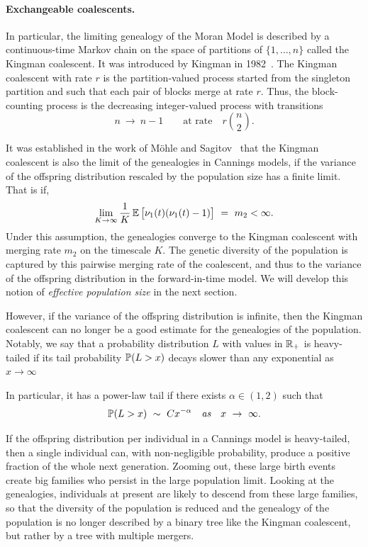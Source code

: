 \paragraph{Exchangeable coalescents.}
In particular, the limiting genealogy of the Moran Model is described by a continuous-time Markov chain on the space of partitions of $\{1,\ldots,n\}$ called the Kingman coalescent. It was introduced by Kingman in 1982~\cite{Kingman:1982aa}.
The Kingman coalescent with rate $r$ is the partition-valued process started from the singleton partition and such that each pair of blocks merge at rate $r$. 
Thus, the block-counting process is the decreasing integer-valued process with transitions
\[
n\ \longrightarrow\ n-1 \qquad \text{at rate}\quad r\binom{n}{2}.
\]

It was established in the work of Möhle and Sagitov~\cite{mohle_1998,Mohle_Sagitov} that the Kingman coalescent is also the limit of the genealogies in Cannings models, if the variance of the offspring distribution rescaled by the population size has a finite limit. That is if,
\[
\lim_{K\to\infty }\frac{1}{K}\operatorname{\mathbb{E}}\big[\nu_1(t)(\nu_1(t)-1)\big]\ =\ m_2<\infty.
\]
Under this assumption, the genealogies converge to the Kingman coalescent with merging rate $m_2$ on the timescale $K$. The genetic diversity of the population is captured by this pairwise merging rate of the coalescent, and thus to the variance of the offspring distribution in the forward-in-time model. We will develop this notion of  \emph{effective population size} in the next section. 


However, if the variance of the offspring distribution is infinite, then the Kingman coalescent can no longer be a good estimate for the genealogies of the population. Notably, we say that a probability distribution $L$ with values in $\operatorname{\mathbb{R}}_+$ is heavy-tailed if its tail probability $\operatorname{\mathbb{P}}(L > x)$ decays slower than any exponential as $x\to\infty$

In particular, it has a power-law tail if there exists $\alpha \in (1,2)$ such that
\[
\operatorname{\mathbb{P}}(L > x)\ \sim\ C x^{-\alpha} \quad \textit{as}\quad x\ \to\ \infty.
\]

If the offspring distribution per individual in a Cannings model is heavy-tailed, then a single individual can, with non-negligible probability, produce a positive fraction of the whole next generation.
Zooming out, these large birth events create big families who persist in the large population limit. Looking at the genealogies, individuals at present are likely to descend from these large families, so that the diversity of the population is reduced and the genealogy of the population is no longer described by a binary tree like the Kingman coalescent, but rather by a tree with multiple mergers. 

